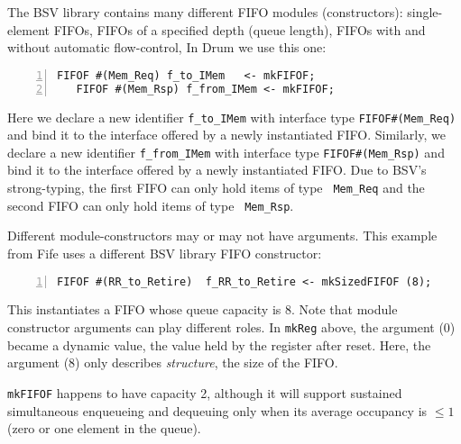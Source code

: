 

The BSV library contains many different FIFO modules (constructors):
single-element FIFOs, FIFOs of a specified depth (queue length), FIFOs
with and without automatic flow-control, {\etc} In Drum we use
this one:


{\small
\begin{Verbatim}[frame=single, numbers=left]
   FIFOF #(Mem_Req) f_to_IMem   <- mkFIFOF;
   FIFOF #(Mem_Rsp) f_from_IMem <- mkFIFOF;
\end{Verbatim}
}

Here we declare a new identifier \verb|f_to_IMem| with interface type
\verb|FIFOF#(Mem_Req)| and bind it to the interface offered by a newly
instantiated FIFO.  Similarly, we declare a new identifier
\verb|f_from_IMem| with interface type \verb|FIFOF#(Mem_Rsp)| and bind
it to the interface offered by a newly instantiated FIFO.  Due to
BSV's strong-typing, the first FIFO can only hold items of type {\tt
Mem\_Req} and the second FIFO can only hold items of type {\tt
Mem\_Rsp}.

Different module-constructors may or may not have arguments.  This
example from Fife uses a different BSV library FIFO constructor:


\begin{Verbatim}[frame=single, numbers=left]
   FIFOF #(RR_to_Retire)  f_RR_to_Retire <- mkSizedFIFOF (8);
\end{Verbatim}

This instantiates a FIFO whose queue capacity is 8.  Note that module
constructor arguments can play different roles.  In \verb|mkReg|
above, the argument (0) became a dynamic value, the value held by the
register after reset.  Here, the argument (8) only describes
\emph{structure}, {\ie} the size of the FIFO.

{\tt mkFIFOF} happens to have capacity 2, although it will support
sustained simultaneous enqueueing and dequeuing only when its average
occupancy is $\leq 1$ (zero or one element in the queue).

